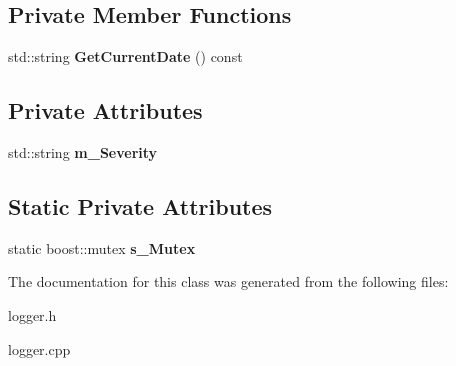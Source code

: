 \subsection*{\-Private \-Member \-Functions}
\begin{DoxyCompactItemize}
\item 
\hypertarget{classengine_1_1cLogger_a62d0c265a5fc3b81f8d31868edc34834}{std\-::string {\bfseries \-Get\-Current\-Date} () const }\label{classengine_1_1cLogger_a62d0c265a5fc3b81f8d31868edc34834}

\end{DoxyCompactItemize}
\subsection*{\-Private \-Attributes}
\begin{DoxyCompactItemize}
\item 
\hypertarget{classengine_1_1cLogger_a8214e9c0a088dbb98a4f4ea7ca9b9351}{std\-::string {\bfseries m\-\_\-\-Severity}}\label{classengine_1_1cLogger_a8214e9c0a088dbb98a4f4ea7ca9b9351}

\end{DoxyCompactItemize}
\subsection*{\-Static \-Private \-Attributes}
\begin{DoxyCompactItemize}
\item 
\hypertarget{classengine_1_1cLogger_a5276c31bbf002c5a224095504bac62c5}{static boost\-::mutex {\bfseries s\-\_\-\-Mutex}}\label{classengine_1_1cLogger_a5276c31bbf002c5a224095504bac62c5}

\end{DoxyCompactItemize}


\-The documentation for this class was generated from the following files\-:\begin{DoxyCompactItemize}
\item 
logger.\-h\item 
logger.\-cpp\end{DoxyCompactItemize}
